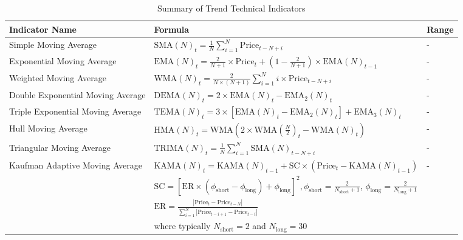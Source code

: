 \begin{table}[htb!]
\caption{Summary of Trend Technical Indicators}
\label{Tables:TrendIndicators}
\centering
\footnotesize
\begin{tabularx}{\textwidth}{@{}lXl@{}}
\toprule
\textbf{Indicator Name} & \textbf{Formula} & \textbf{Range} \\ 
\midrule
Simple Moving Average & $\text{SMA}(N)_t = \frac{1}{N} \sum_{i=1}^{N} \text{Price}_{t-N+i}$ & - \\
\addlinespace
Exponential Moving Average & $\text{EMA}(N)_t = \frac{2}{N+1} \times \text{Price}_t + (1 - \frac{2}{N+1}) \times \text{EMA}(N)_{t-1}$ & - \\
\addlinespace
Weighted Moving Average & $\text{WMA}(N)_t = \frac{2}{N \times (N + 1)} \sum_{i=1}^{N} i \times \text{Price}_{t-N+i}$ & - \\
\addlinespace
Double Exponential Moving Average & $\text{DEMA}(N)_t = 2 \times \text{EMA}(N)_t - \text{EMA}_2(N)_t$ & - \\
\addlinespace
Triple Exponential Moving Average & $\text{TEMA}(N)_t = 3 \times [\text{EMA}(N)_t - \text{EMA}_2(N)_t] + \text{EMA}_3(N)_t$ & - \\
\addlinespace
Hull Moving Average & $\text{HMA}(N)_t = \text{WMA}\left(2 \times \text{WMA}\left(\frac{N}{2}\right)_t - \text{WMA}(N)_t\right)$ & - \\
\addlinespace
Triangular Moving Average & $\text{TRIMA}(N)_t = \frac{1}{N} \sum_{i=1}^{N} \text{SMA}(N)_{t-N+i}$ & - \\
\addlinespace
Kaufman Adaptive Moving Average & $\text{KAMA}(N)_t = \text{KAMA}(N)_{t-1} + \text{SC} \times (\text{Price}_t - \text{KAMA}(N)_{t-1})$ & - \\
\addlinespace
& $\text{SC} = [ \text{ER} \times (\phi_{\text{short}} - \phi_{\text{long}}) + \phi_{\text{long}} ]^2, \phi_{\text{short}} = \frac{2}{N_{\text{short}} + 1}$, $\phi_{\text{long}} = \frac{2}{N_{\text{long}} + 1}$ & \\
\addlinespace
& $\text{ER} = \frac{| \text{Price}_t - \text{Price}_{t-N} |}{\sum_{i=1}^{N} | \text{Price}_{t-i+1} - \text{Price}_{t-i} |}$ & \\
\addlinespace
& where typically $N_{\text{short}} = 2$ and $N_{\text{long}} = 30$ & \\
\bottomrule
\end{tabularx}
\end{table}
